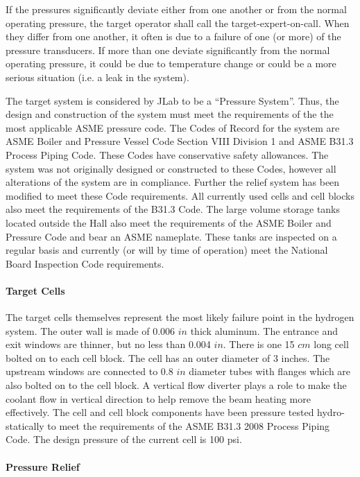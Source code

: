 \begin{safetyen}{0}{0}
If the pressures significantly deviate either from one another or
from the normal operating pressure, the target operator shall call
the target-expert-on-call. When they differ from one another, it often
is due to a failure of one (or more) of the pressure transducers.
If more than one deviate significantly from the normal operating pressure,
it could be due to temperature change or could be a more serious situation
(i.e. a leak in the system).

The target system is considered by JLab to be a ``Pressure System''.
Thus, the design and construction of the system must meet the requirements
of the the most applicable ASME pressure code. The Codes of Record
for the system are ASME Boiler and Pressure Vessel Code Section VIII
Division 1 and ASME B31.3 Process Piping Code. These Codes have conservative
safety allowances. The system was not originally designed or constructed
to these Codes, however all alterations of the system are in compliance.
Further the relief system has been modified to meet these Code requirements.
All currently used cells and cell blocks also meet the requirements
of the B31.3 Code. The large volume storage tanks located outside
the Hall also meet the requirements of the ASME Boiler and Pressure
Code and bear an ASME nameplate. These tanks are inspected on a regular
basis and currently (or will by time of operation) meet the National
Board Inspection Code requirements.

\paragraph{Target Cells}

The target cells themselves represent the most likely failure point
in the hydrogen system. The outer wall is made of 0.006 $in$ thick
aluminum. The entrance and exit windows are thinner, but no less than
0.004 $in$. There is one 15 $cm$ long cell bolted on to each cell
block. The cell has an outer diameter of 3 inches. The upstream windows
are connected to 0.8 $in$ diameter tubes with flanges which are also
bolted on to the cell block. A vertical flow diverter plays a role
to make the coolant flow in vertical direction to help remove the
beam heating more effectively. The cell and cell block components
have been pressure tested hydro-statically to meet the requirements
of the ASME B31.3 2008 Process Piping Code. The design pressure of
the current cell is 100 psi.


\paragraph{Pressure Relief}


\end{safetyen}
